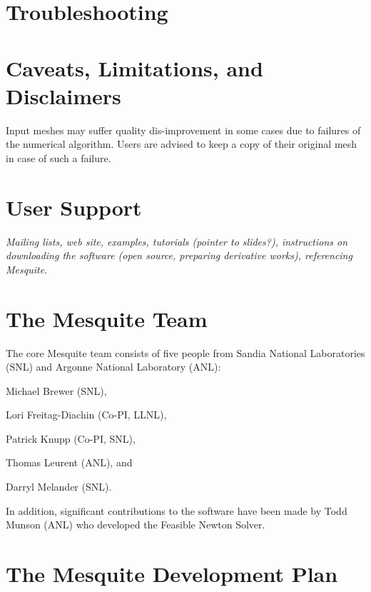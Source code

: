 \documentclass[letter]{report}
\begin{document}
\chapter{Troubleshooting}

\chapter{Caveats, Limitations, and Disclaimers}

Input meshes may suffer quality dis-improvement in some cases due to
failures of the numerical algorithm. Users are advised to keep a copy
of their original mesh in case of such a failure.

\chapter{User Support}

{\it Mailing lists, web site, examples, tutorials (pointer to slides?), 
instructions on downloading the software (open source, preparing 
derivative works), referencing Mesquite.}

\chapter{The Mesquite Team}

The core Mesquite team consists of five people from Sandia
National Laboratories (SNL) and Argonne National Laboratory (ANL): \newline

Michael Brewer (SNL), \newline

Lori Freitag-Diachin (Co-PI, LLNL), \newline

Patrick Knupp (Co-PI, SNL),\newline

Thomas Leurent (ANL), and \newline

Darryl Melander (SNL).  \newline

\noindent In addition,
significant contributions to the software have been made by
Todd Munson (ANL) who developed the Feasible Newton Solver.

\chapter{The Mesquite Development Plan}
\end{document}
